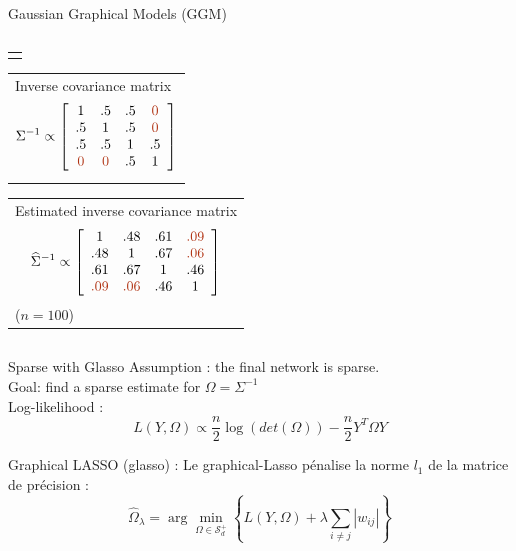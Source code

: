 \documentclass{beamer}
\newcommand{\emphase}[1]{\textcolor{Complement}{#1}}
\begin{document}
\begin{frame}{Gaussian Graphical Models (GGM)}
\begin{columns}
\begin{column}{12cm}
\begin{overprint}
\begin{tabular}{p{}}
$$	 $$
    \end{tabular} 
    \begin{tabular}{p{}}
	 Inverse covariance matrix
	 $$
	 \Sigma^{-1} \propto \left[ \begin{array}{cccc}
	   1 & .5 & .5 & \emphase{0} \\
	   .5 & 1 & .5 & \emphase{0} \\
	   .5 & .5 & 1 & .5 \\
	   \emphase{0} & \emphase{0} & .5 & 1
	   \end{array} \right] 
	 $$
    \end{tabular} 
    \begin{tabular}{p{}}
	 Estimated inverse covariance matrix
	 $$
	 \widehat{\Sigma}^{-1} \propto \left[ \begin{array}{cccc}
	   1 & .48 & .61 & \emphase{.09} \\
	   .48 & 1 & .67 & \emphase{.06} \\
	   .61 & .67 & 1 & .46 \\
	   \emphase{.09} & \emphase{.06} & .46 & 1
	   \end{array} \right] 
	 $$
	 ($n = 100$)
    \end{tabular} 
    \end{overprint}
  \end{column}
  \end{columns}



\end{frame}
\begin{frame}{Sparse with Glasso}
Assumption : the final network is sparse.\\
{\color{Nicered}Goal: find a sparse estimate for $\Omega=\Sigma^{-1}$}
\\
\emphase{Log-likelihood :}
 \[L(Y,\Omega) \propto \frac{n}{2}\log(det(\Omega))-\frac{n}{2} Y^T\Omega Y\]


 \begin{block}{ Graphical LASSO (glasso) :}
  Le graphical-Lasso pénalise la norme $l_1$ de la matrice de précision :
  \[\widehat{\Omega}_\lambda = \arg\min_{\Omega \in \mathcal{S}_d^+}\left\{ L(Y,\Omega)+\lambda \sum_{i\neq j} |w_{ij}| \right\}\]
 \end{block}
 
\end{frame}
\end{document}
